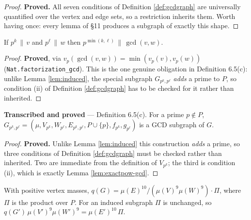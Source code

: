 \begin{proof}
  \leanok
  \textbf{Proved.} All seven conditions of Definition \ref{def:gcdgraph} are universally
  quantified over the vertex and edge sets, so a restriction inherits them. Worth having
  once: every lemma of \S11 produces a subgraph of exactly this shape.
\end{proof}

\begin{lemma}
  \label{lem:exactpow-gcd}
  \leanok
  If $p^k \,\|\, v$ and $p^\ell \,\|\, w$ then $p^{\min(k,\ell)} \,\|\, \gcd(v,w)$.
\end{lemma}

\begin{proof}
  \leanok
  \textbf{Proved}, via $v_p(\gcd(v,w)) = \min(v_p(v), v_p(w))$
  (\texttt{Nat.factorization\_gcd}). This is the one genuine obligation in Definition
  6.5(c): unlike Lemma \ref{lem:induced}, the special subgraph $G_{p^k,p^\ell}$ \emph{adds}
  a prime to $P$, so condition (ii) of Definition \ref{def:gcdgraph} has to be checked for
  it rather than inherited.
\end{proof}

\begin{lemma}
  \label{lem:special}
  \leanok
  \textbf{Transcribed and proved} --- Definition 6.5(c). For a prime $p \notin P$,
  $G_{p^k,p^\ell} = (\mu, V_{p^k}, W_{p^\ell}, E_{p^k,p^\ell}, P \cup \{p\},
  f_{p^k}, g_{p^\ell})$ is a GCD subgraph of $G$.
\end{lemma}

\begin{proof}
  \leanok
  \textbf{Proved.} Unlike Lemma \ref{lem:induced} this construction \emph{adds} a prime,
  so three conditions of Definition \ref{def:gcdgraph} must be checked rather than
  inherited. Two are immediate from the definition of $V_{p^k}$; the third is condition
  (ii), which is exactly Lemma \ref{lem:exactpow-gcd}.
\end{proof}

\begin{lemma}
  \label{lem:quality-eq}
  \leanok
  With positive vertex masses, $q(G) = \mu(E)^{10}/(\mu(V)^9\mu(W)^9) \cdot \Pi$, where
  $\Pi$ is the product over $P$. For an induced subgraph $\Pi$ is unchanged, so
  $q(G')\,\mu(V')^9\mu(W')^9 = \mu(E')^{10}\,\Pi$.
\end{lemma}

